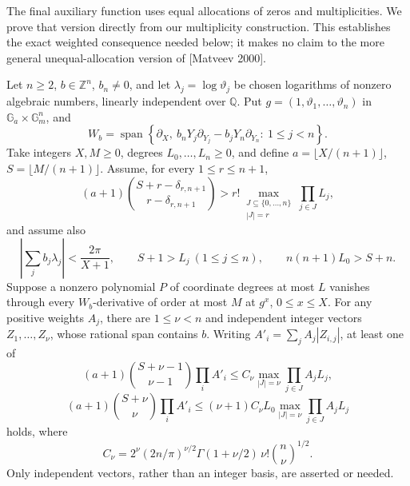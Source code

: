 \documentclass[
  11pt,
  a4paper,
]{article}
\begin{document}
The final auxiliary function uses equal allocations of zeros and
multiplicities. We prove that version directly from our multiplicity
construction. This establishes the exact weighted consequence needed
below; it makes no claim to the more general unequal-allocation version
of {[}Matveev 2000{]}.

Let \(n\ge2\), \(b\in\mathbb Z^n\), \(b_n\ne0\), and let
\(\lambda_j=\log\vartheta_j\) be chosen logarithms of nonzero algebraic
numbers, linearly independent over \(\mathbb Q\). Put
\(g=(1,\vartheta_1,\ldots,\vartheta_n)\) in
\(\mathbb G_a\times\mathbb G_m^n\), and \[
W_b=\operatorname{span}\left\{
\partial_X,\ b_nY_j\partial_{Y_j}-b_jY_n\partial_{Y_n}
:\ 1\le j<n\right\}.
\] Take integers \(X,M\ge0\), degrees \(L_0,\ldots,L_n\ge0\), and define
\(a=\lfloor X/(n+1)\rfloor\), \(S=\lfloor M/(n+1)\rfloor\). Assume, for
every \(1\le r\le n+1\), \[
(a+1)\binom{S+r-\delta_{r,n+1}}{r-\delta_{r,n+1}}
>r!\max_{\substack{J\subseteq\{0,\ldots,n\}\\|J|=r}}
\prod_{j\in J}L_j,
\tag{8.77}
\] and assume also \[
\left|\sum_jb_j\lambda_j\right|<\frac{2\pi}{X+1},
\qquad S+1>L_j\ (1\le j\le n),
\qquad n(n+1)L_0>S+n.
\tag{8.78}
\] Suppose a nonzero polynomial \(P\) of coordinate degrees at most
\(L\) vanishes through every \(W_b\)-derivative of order at most \(M\)
at \(g^x\), \(0\le x\le X\). For any positive weights \(A_j\), there are
\(1\le\nu<n\) and independent integer vectors \(Z_1,\ldots,Z_\nu\),
whose rational span contains \(b\). Writing \(A'_i=\sum_jA_j|Z_{i,j}|\),
at least one of \[
(a+1)\binom{S+\nu-1}{\nu-1}\prod_iA'_i
\le C_\nu\max_{|J|=\nu}\prod_{j\in J}A_jL_j,
\tag{8.79}
\] \[
(a+1)\binom{S+\nu}{\nu}\prod_iA'_i
\le(\nu+1)C_\nu L_0\max_{|J|=\nu}\prod_{j\in J}A_jL_j
\tag{8.80}
\] holds, where \[
C_\nu=
2^\nu(2n/\pi)^{\nu/2}
\Gamma(1+\nu/2)\,\nu!\binom n\nu^{1/2}.
\tag{8.81}
\] Only independent vectors, rather than an integer basis, are asserted
or needed.
\end{document}
